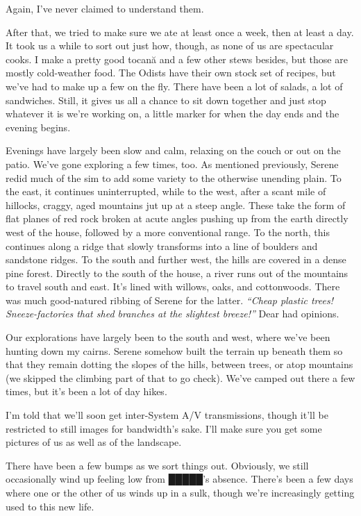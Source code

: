 Again, I've never claimed to understand them.

After that, we tried to make sure we ate at least once a week, then at least a day. It took us a while to sort out just how, though, as none of us are spectacular cooks. I make a pretty good tocană and a few other stews besides, but those are mostly cold-weather food. The Odists have their own stock set of recipes, but we've had to make up a few on the fly. There have been a lot of salads, a lot of sandwiches. Still, it gives us all a chance to sit down together and just stop whatever it is we're working on, a little marker for when the day ends and the evening begins.

Evenings have largely been slow and calm, relaxing on the couch or out on the patio. We've gone exploring a few times, too. As mentioned previously, Serene redid much of the sim to add some variety to the otherwise unending plain. To the east, it continues uninterrupted, while to the west, after a scant mile of hillocks, craggy, aged mountains jut up at a steep angle. These take the form of flat planes of red rock broken at acute angles pushing up from the earth directly west of the house, followed by a more conventional range. To the north, this continues along a ridge that slowly transforms into a line of boulders and sandstone ridges. To the south and further west, the hills are covered in a dense pine forest. Directly to the south of the house, a river runs out of the mountains to travel south and east. It's lined with willows, oaks, and cottonwoods. There was much good-natured ribbing of Serene for the latter. \emph{``Cheap plastic trees! Sneeze-factories that shed branches at the slightest breeze!''} Dear had opinions.

Our explorations have largely been to the south and west, where we've been hunting down my cairns. Serene somehow built the terrain up beneath them so that they remain dotting the slopes of the hills, between trees, or atop mountains (we skipped the climbing part of that to go check). We've camped out there a few times, but it's been a lot of day hikes.

I'm told that we'll soon get inter-System A/V transmissions, though it'll be restricted to still images for bandwidth's sake. I'll make sure you get some pictures of us as well as of the landscape.

There have been a few bumps as we sort things out. Obviously, we still occasionally wind up feeling low from █████'s absence. There's been a few days where one or the other of us winds up in a sulk, though we're increasingly getting used to this new life.

